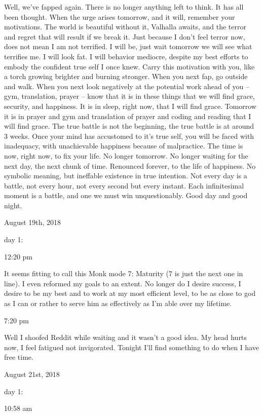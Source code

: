 Well, we've fapped again. There is no longer anything left to think. It
has all been thought. When the urge arises tomorrow, and it will,
remember your motivations. The world is beautiful without it, Valhalla
awaits, and the terror and regret that will result if we break it. Just
because I don't feel terror now, does not mean I am not terrified. I
will be, just wait tomorrow we will see what terrifies me. I will look
fat. I will behavior mediocre, despite my best efforts to embody the
confident true self I once knew. Carry this motivation with you, like a
torch growing brighter and burning stronger. When you next fap, go
outside and walk. When you next look negatively at the potential work
ahead of you -- gym, translation, prayer -- know that it is in these
things that we will find grace, security, and happiness. It is in sleep,
right now, that I will find grace. Tomorrow it is in prayer and gym and
translation of prayer and coding and reading that I will find grace. The
true battle is not the beginning, the true battle is at around 3 weeks.
Once your mind has accustomed to it's true self, you will be faced with
inadequacy, with unachievable happiness because of malpractice. The time
is now, right now, to fix your life. No longer tomorrow. No longer
waiting for the next day, the next chunk of time. Renounced forever, to
the life of happiness. No symbolic meaning, but ineffable existence in
true intention. Not every day is a battle, not every hour, not every
second but every instant. Each infinitesimal moment is a battle, and one
we must win unquestionably. Good day and good night.

\bigskip
\bigskip
August 19th, 2018

day 1:

12:20 pm

It seems fitting to call this Monk mode 7: Maturity (7 is just the next
one in line). I even reformed my goals to an extent. No longer do I
desire success, I desire to be my best and to work at my most efficient
level, to be as close to god as I can or rather to serve him as
effectively as I'm able over my lifetime.

7:20 pm

Well I shoofed Reddit while waiting and it wasn't a good idea. My head
hurts now, I feel fatigued not invigorated. Tonight I'll find something
to do when I have free time.

\bigskip
\bigskip
August 21st, 2018

day 1:

10:58 am

